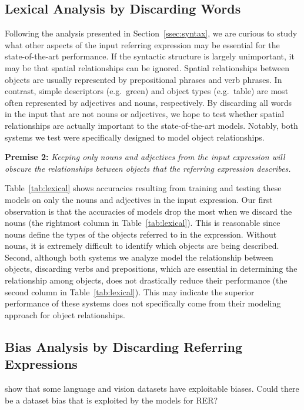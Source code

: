 \documentclass[11pt,a4paper]{article}
\begin{document}
\subsection{Lexical Analysis by Discarding Words}\label{ssec:lexical}%
Following the analysis presented in Section~\ref{ssec:syntax}, we are curious to study what other aspects of the input referring expression may be essential for the state-of-the-art performance.
If the syntactic structure is largely unimportant, it may be that spatial relationships can be ignored.
Spatial relationships between objects are usually represented by prepositional phrases and verb phrases.
In contrast, simple descriptors (e.g.~green) and object types (e.g.~table) are most often represented by adjectives and nouns, respectively. By discarding all words in the input that are not nouns or adjectives, we hope to test whether spatial relationships are actually important to the state-of-the-art models.
Notably, both systems we test were specifically designed to model object relationships.

\noindent\textbf{Premise 2:} \textit{Keeping only nouns and adjectives from the input expression will obscure the relationships between objects that the referring expression describes.}

Table~\ref{tab:lexical} shows accuracies resulting from training and testing these models on only the nouns and adjectives in the input expression. Our first observation is that the accuracies of models drop the most when we discard the nouns (the rightmost column in Table~\ref{tab:lexical}).
\tablesix
This is reasonable since nouns define the types of the objects referred to in the expression. Without nouns, it is extremely difficult to identify which objects are being described.
Second, although both systems we analyze model the relationship between objects, discarding verbs and prepositions, which are essential in determining the relationship among objects, does not drastically reduce their performance (the second column in Table~\ref{tab:lexical}).
This may indicate the superior performance of these systems does not specifically come from their 
modeling approach for object relationships.

\subsection{Bias Analysis by Discarding Referring Expressions}\label{ssec:refexp}%
\citet{goyal2016making} show that some language and vision datasets have exploitable biases. 
Could there be a dataset bias that is exploited by the models for RER?
\end{document}
